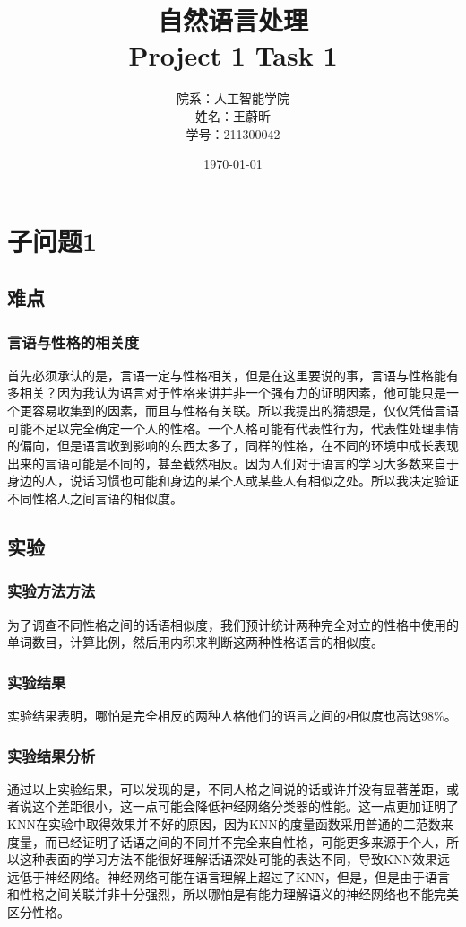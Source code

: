 \documentclass{article}
\title{\huge  自然语言处理\\ \large Project 1 Task 1}
\author{院系：人工智能学院\\姓名：王蔚昕\\学号：211300042}
\date{\today}
\begin{document}
	\maketitle
	\newpage
	\tableofcontents
	\newpage
	\section{子问题1}
	\subsection{难点}
	\subsubsection{言语与性格的相关度}
	首先必须承认的是，言语一定与性格相关，但是在这里要说的事，言语与性格能有多相关？因为我认为语言对于性格来讲并非一个强有力的证明因素，他可能只是一个更容易收集到的因素，而且与性格有关联。所以我提出的猜想是，仅仅凭借言语可能不足以完全确定一个人的性格。一个人格可能有代表性行为，代表性处理事情的偏向，但是语言收到影响的东西太多了，同样的性格，在不同的环境中成长表现出来的言语可能是不同的，甚至截然相反。因为人们对于语言的学习大多数来自于身边的人，说话习惯也可能和身边的某个人或某些人有相似之处。所以我决定验证不同性格人之间言语的相似度。
	\subsubsection{}
	\subsection{实验}
	\subsubsection{实验方法方法}
	为了调查不同性格之间的话语相似度，我们预计统计两种完全对立的性格中使用的单词数目，计算比例，然后用内积来判断这两种性格语言的相似度。
	\subsubsection{实验结果}
	实验结果表明，哪怕是完全相反的两种人格他们的语言之间的相似度也高达98\%。
	\subsubsection{实验结果分析}
	通过以上实验结果，可以发现的是，不同人格之间说的话或许并没有显著差距，或者说这个差距很小，这一点可能会降低神经网络分类器的性能。这一点更加证明了KNN在实验中取得效果并不好的原因，因为KNN的度量函数采用普通的二范数来度量，而已经证明了话语之间的不同并不完全来自性格，可能更多来源于个人，所以这种表面的学习方法不能很好理解话语深处可能的表达不同，导致KNN效果远远低于神经网络。神经网络可能在语言理解上超过了KNN，但是，但是由于语言和性格之间关联并非十分强烈，所以哪怕是有能力理解语义的神经网络也不能完美区分性格。
	
\end{document}
